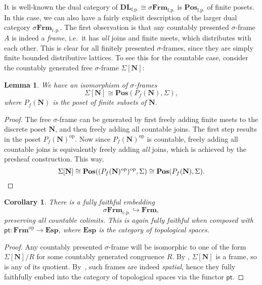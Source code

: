 \documentclass[a4paper,12pt]{amsart}
\newtheorem{lemma}[theorem]{Lemma}
\newtheorem{corollary}[theorem]{Corollary}
\theoremstyle{definition}
\newcommand{\mb}[1]{\mathbf{#1}}
\newcommand{\mr}[1]{\mathrm{#1}}
\newcommand{\ms}[1]{\mathsf{#1}}
\newcommand{\Pos}{\mb{Pos}}
\newcommand{\DL}{\mb{DL}}
\newcommand{\op}{^{\mathrm{op}}}
\newcommand{\hook}{\hookrightarrow}
\newcommand{\fp}{_{\mr{f.p.}}}
\newcommand{\cp}{_{\mr{c.p.}}}
\newcommand{\N}{\mb N}
\newcommand{\pt}{\ms{pt}}
\newcommand{\sFrm}{\sigma\mb{Frm}}
\newcommand{\Frm}{\mb{Frm}}
\newcommand{\Topp}{\mb{Esp}}
\begin{document}
It is well-known the dual category of $\DL\fp \cong \sFrm\fp$ is $\Pos\fp$ of finite posets. In this case, we can also have a fairly explicit description of the larger dual category $\sFrm\cp$. The first observation is that any countably presented $\sigma$-frame $A$ is indeed a \emph{frame}, i.e.\ it has \emph{all} joins and finite meets, which distributes with each other. This is clear for all finitely presented $\sigma$-frames, since they are simply finite bounded distributive lattices. To see this for the countable case, consider the countably generated free $\sigma$-frame $\Sigma[\N]$:

\begin{lemma}\label{lem:cgfreesframe}
  We have an isomorphism of $\sigma$-frames
  \[ \Sigma[\N] \cong \Pos(P_f(\N),\Sigma), \]
  where $P_f(\N)$ is the poset of finite subsets of $\N$.
\end{lemma}
\begin{proof}
  The free $\sigma$-frame can be generated by first freely adding finite meets to the discrete poset $\N$, and then freely adding all countable joins. The first step results in the poset $P_f(\N)\op$. Now since $P_f(\N)\op$ is countable, freely adding all countable joins is equivalently freely adding \emph{all} joins, which is achieved by the presheaf construction. This way,
  \[ \Sigma[\N] \cong \Pos((P_f(\N)\op)\op,\Sigma) \cong \Pos(P_f(\N),\Sigma). \qedhere \]
\end{proof}


\begin{corollary}\label{cor:dualsframe}
  There is a fully faithful embedding
  \[ \sFrm\cp \hook \Frm, \]
  preserving all countable colimits. This is again fully faithful when composed with $\ms{pt} \colon \Frm\op \to \Topp$, where $\Topp$ is the category of topological spaces.
\end{corollary}
\begin{proof}
  Any countably presented $\sigma$-frame will be isomorphic to one of the form $\Sigma[\N]/R$ for some countably generated congruence $R$. By , $\Sigma[\N]$ is a frame, so is any of its quotient. By~\cite[Thm. 6.2.4]{makkai2006first}, such frames are indeed \emph{spatial}, hence they fully faithfully embed into the category of topological spaces via the functor $\pt$.
\end{proof}
\end{document}
